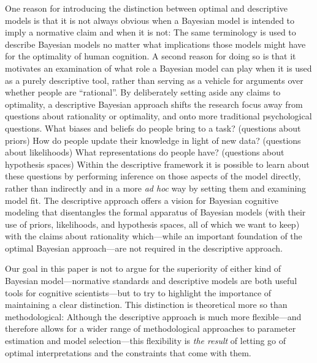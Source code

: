 One reason for introducing the distinction between optimal and descriptive models  is that it is not always obvious when a Bayesian model is intended to imply a normative claim and when it is not: The same terminology is used to describe Bayesian models no matter what implications those models might have for the optimality of human cognition. A second reason for doing so is that it motivates an examination of what role a Bayesian model can play when it is used as a purely descriptive tool, rather than serving as a vehicle for arguments over whether people are ``rational''. By deliberately setting aside any claims to optimality, a descriptive Bayesian approach shifts the research focus away from questions about rationality or optimality, and onto more traditional psychological questions. What biases and beliefs do people bring to a task? (questions about priors) How do people update their knowledge in light of new data? (questions about likelihoods) What representations do people have? (questions about hypothesis spaces) Within the descriptive framework it is possible to learn about these questions by performing inference on those aspects of the model directly, rather than indirectly and in a more {\it ad hoc} way by setting them and examining model fit. The descriptive approach offers a vision for Bayesian cognitive modeling that disentangles the formal apparatus of Bayesian models (with their use of priors, likelihoods, and hypothesis spaces, all of which we want to keep) with the claims about rationality which---while an important foundation of the optimal Bayesian approach---are not required in the descriptive approach.

Our goal in this paper is not to argue for the superiority of either kind of Bayesian model---normative standards and descriptive models are both useful tools for cognitive scientists---but to try to highlight the importance of maintaining a clear distinction. This distinction is theoretical more so than methodological: Although the descriptive approach is much more flexible---and therefore allows for a wider range of methodological approaches to parameter estimation and model selection---this flexibility is \textit{the result} of letting go of optimal interpretations and the constraints that come with them.

